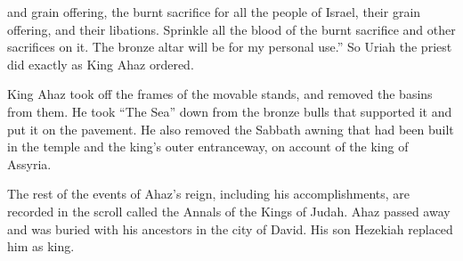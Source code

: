 {and grain offering,
the burnt sacrifice
for all
the people
of Israel, their grain offering,
and their libations.
Sprinkle
all
the blood
of the burnt sacrifice
and other
sacrifices
on
it. The bronze
altar
will be for my personal use.”
So Uriah
the priest
did exactly
as King
Ahaz
ordered.
\par }{\PP {}King
Ahaz
took off
the
frames
of the movable stands,
and removed
the basins from them. He took “The Sea”
down
from the bronze
bulls
that
supported it and put
it on
the pavement.
He also removed the Sabbath
awning
that had
been built
in the temple
and the king’s
outer
entranceway,
on account of the king
of Assyria.
\par }{\PP {}The rest
of the events
of Ahaz’s
reign, including
his accomplishments,
are recorded
in the scroll
called the Annals
of the Kings
of Judah.
Ahaz
passed away
and was buried
with
his ancestors
in the city
of David.
His son
Hezekiah
replaced
him as king.

}
